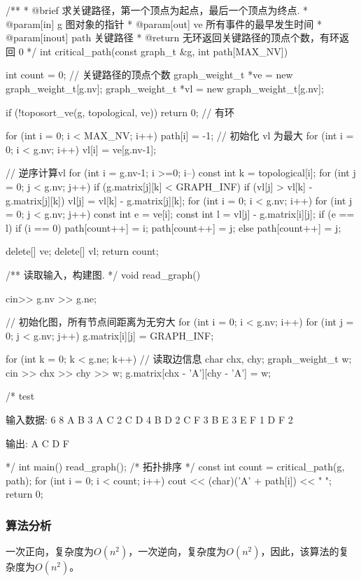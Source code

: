 \begin{Codex}[label=am_graph_critical_path.cpp]
/**
  * @brief 求关键路径，第一个顶点为起点，最后一个顶点为终点.
  * @param[in] g 图对象的指针
  * @param[out] ve 所有事件的最早发生时间
  * @param[inout] path 关键路径
  * @return 无环返回关键路径的顶点个数，有环返回 0
  */
int critical_path(const graph_t &g, int path[MAX_NV]) {
    int count = 0;    // 关键路径的顶点个数
    graph_weight_t *ve = new graph_weight_t[g.nv];
    graph_weight_t *vl = new graph_weight_t[g.nv];

    if (!toposort_ve(g, topological, ve)) return 0;  // 有环

    for (int i = 0; i < MAX_NV; i++) path[i] = -1;
    // 初始化 vl 为最大
    for (int i = 0; i < g.nv; i++) vl[i] = ve[g.nv-1];

    // 逆序计算vl
    for (int i = g.nv-1; i >=0; i--) {
        const int k = topological[i];
        for (int j = 0; j < g.nv; j++) {
            if (g.matrix[j][k] < GRAPH_INF) {
                if (vl[j] > vl[k] - g.matrix[j][k])
                    vl[j] = vl[k] - g.matrix[j][k];
            }
        }
    }
    for (int i = 0; i < g.nv; i++) {
        for (int j = 0; j < g.nv; j++) {
            const int e = ve[i];
            const int l = vl[j] - g.matrix[i][j];
            if (e == l) {
                if (i == 0) {
                    path[count++] = i;
                    path[count++] = j;
                } else {
                    path[count++] = j;
                }
            }
        }
    }

    delete[] ve;
    delete[] vl;
    return count;
}

/** 读取输入，构建图. */
void read_graph() {
    cin>> g.nv >> g.ne;

    // 初始化图，所有节点间距离为无穷大
    for (int i = 0; i < g.nv; i++)
        for (int j = 0; j < g.nv; j++)
            g.matrix[i][j] = GRAPH_INF;

    for (int k = 0; k < g.ne; k++) {  // 读取边信息
        char chx, chy;
        graph_weight_t w;
        cin >> chx >> chy >> w;
        g.matrix[chx - 'A'][chy - 'A'] = w;
    }
}

/* test

输入数据:
6 8
A B 3
A C 2
C D 4
B D 2
C F 3
B E 3
E F 1
D F 2

输出: A C D F

*/
int main() {
    read_graph();
    /* 拓扑排序 */
    const int count = critical_path(g, path);
    for (int i = 0; i < count; i++) {
        cout << (char)('A' + path[i]) << " ";
    }
    return 0;
}
\end{Codex}

\subsubsection{算法分析}
一次正向，复杂度为$O(n^2)$，一次逆向，复杂度为$O(n^2)$，因此，该算法的复杂度为$O(n^2)$。
